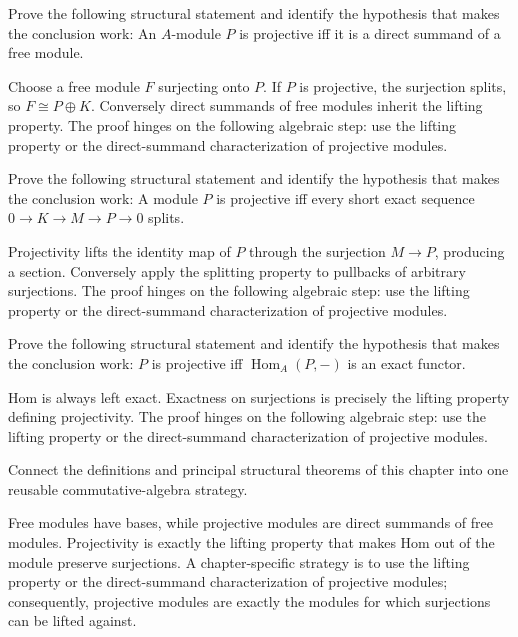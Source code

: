 \begin{problem}\label{prob:v13-problem-09}
Prove the following structural statement and identify the hypothesis that makes the conclusion work: An $A$-module $P$ is projective iff it is a direct summand of a free module.
\end{problem}
\begin{solution}
Choose a free module $F$ surjecting onto $P$. If $P$ is projective, the surjection splits, so $F\cong P\oplus K$. Conversely direct summands of free modules inherit the lifting property. The proof hinges on the following algebraic step: use the lifting property or the direct-summand characterization of projective modules.
\end{solution}

\begin{problem}\label{prob:v13-problem-10}
Prove the following structural statement and identify the hypothesis that makes the conclusion work: A module $P$ is projective iff every short exact sequence $0\to K\to M\to P\to0$ splits.
\end{problem}
\begin{solution}
Projectivity lifts the identity map of $P$ through the surjection $M\to P$, producing a section. Conversely apply the splitting property to pullbacks of arbitrary surjections. The proof hinges on the following algebraic step: use the lifting property or the direct-summand characterization of projective modules.
\end{solution}

\begin{problem}\label{prob:v13-problem-11}
Prove the following structural statement and identify the hypothesis that makes the conclusion work: $P$ is projective iff $\operatorname{Hom}_A(P,-)$ is an exact functor.
\end{problem}
\begin{solution}
Hom is always left exact. Exactness on surjections is precisely the lifting property defining projectivity. The proof hinges on the following algebraic step: use the lifting property or the direct-summand characterization of projective modules.
\end{solution}

\begin{problem}\label{prob:v13-problem-12}
Connect the definitions and principal structural theorems of this chapter into one reusable commutative-algebra strategy.
\end{problem}
\begin{solution}
Free modules have bases, while projective modules are direct summands of free modules. Projectivity is exactly the lifting property that makes Hom out of the module preserve surjections. A chapter-specific strategy is to use the lifting property or the direct-summand characterization of projective modules; consequently, projective modules are exactly the modules for which surjections can be lifted against.
\end{solution}

